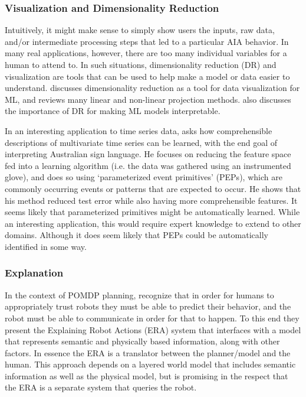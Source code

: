 \subsubsection{Visualization and Dimensionality Reduction}
    Intuitively, it might make sense to simply show users the inputs, raw data, and/or intermediate processing steps that led to a particular AIA behavior. In many real applications, however, there are too many individual variables for a human to attend to. In such situations, dimensionality reduction (DR) and visualization are tools that can be used to help make a model or data easier to understand. \citet{Venna2007-yj} discusses dimensionality reduction as a tool for data visualization for ML, and reviews many linear and non-linear projection methods. \citet{Vellido2012-nm} also discusses the importance of DR for making ML models interpretable.

    In an interesting application to time series data, \citet{Kadous1999-rx} asks how comprehensible descriptions of multivariate time series can be learned, with the end goal of interpreting Australian sign language. He focuses on reducing the feature space fed into a learning algorithm (i.e. the data was gathered using an instrumented glove), and does so using `parameterized event primitives' (PEPs), which are commonly occurring events or patterns that are expected to occur. He shows that his method reduced test error while also having more comprehensible features. It seems likely that parameterized primitives might be automatically learned. While an interesting application, this would require expert knowledge to extend to other domains. Although it does seem likely that PEPs could be automatically identified in some way.

\subsubsection{Explanation}
    In the context of POMDP planning, \citet{Lomas2012-ie} recognize that in order for humans to appropriately trust robots they must be able to predict their behavior, and the robot must be able to communicate in order for that to happen. To this end they present the Explaining Robot Actions (ERA) system that interfaces with a model that represents semantic and physically based information, along with other factors. In essence the ERA is a translator between the planner/model and the human. This approach depends on a layered world model that includes semantic information as well as the physical model, but is promising in the respect that the ERA is a separate system that queries the robot. 

